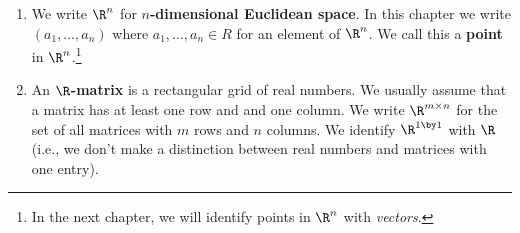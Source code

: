 \begin{enumerate}
  \textit{Examples.}
  \begin{itemize}
  \item The following is a system of two linear equations over the
    variables $x$ and $y$.  This system represents a pair of lines in
    the plane that intersect at a single point.
    \begin{equation}
      \begin{split}
        2x + 3y &= 4 \\
        -5x + 3y &= 0
      \end{split}
      \label{lin-sys-ex-1}
    \end{equation}
  \item The following is a system of three linear equations over four
    variables.  Note that equations are required to have nonzero
    coefficients for every variable.
    \begin{equation}
      \begin{split}
      3x_1 - 4.4x_2 &= 1 \\
      200x_1 + 200x_2 + x_3 + 200x_4 &= 200 \\
      9x_1 - x_2 - 5x_4 &= 98
      \end{split}
      \label{lin-sys-ex-2}
    \end{equation}
  \end{itemize}
\item
  We write $\R^n$ for \textbf{$n$-dimensional Euclidean space}.  In
  this chapter we write $(a_1, \dots, a_n)$ where $a_1, \dots, a_n \in
  R$ for an element of $\R^n$.  We call this a \textbf{point} in
  $\R^n$.\footnote{In the next chapter, we will identify points in
  $\R^n$ with \textit{vectors}.}
\item
  An \textbf{$\R$-matrix} is a rectangular grid of real numbers.  We
  usually assume that a matrix has at least one row and and one
  column.  We write $\R^{m \times n}$ for the set of all matrices with
  $m$ rows and $n$ columns.  We identify $\R^{1 \by 1}$ with $\R$
  (i.e., we don't make a distinction between real numbers and matrices
  with one entry).


\end{enumerate}
